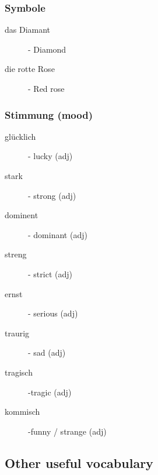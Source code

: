 \documentclass{article}
\begin{document}
\subsubsection{Symbole}
\begin{multicols}{2}
\begin{description}
\item[das Diamant] - Diamond
\item[die rotte Rose] - Red rose
\end{description}
\end{multicols}
\subsubsection{Stimmung (mood)}
\begin{multicols}{2}
\begin{description}
\item[gl\"ucklich] - lucky (adj)
\item[stark] - strong (adj)
\item[dominent] - dominant (adj)
\item[streng] - strict (adj)
\item[ernst] - serious (adj)
\item[traurig] - sad (adj)
\item[tragisch] -tragic (adj)
\item[kommisch] -funny / strange (adj)
\end{description}
\end{multicols}


\subsection{Other useful vocabulary}
\end{document}
